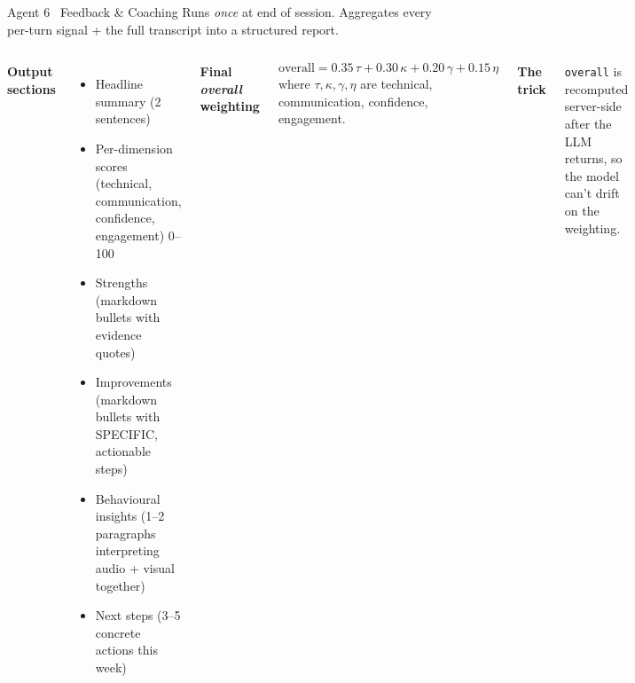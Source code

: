 \documentclass[aspectratio=169,10pt]{beamer}
\newcommand{\biglabel}[1]{\textcolor{brand}{\bfseries\large #1}}
\begin{document}
\begin{frame}{Agent 6 \textbullet\ Feedback \& Coaching}
  \vspace{0.2cm}
  \footnotesize
  Runs \emph{once} at end of session. Aggregates every per-turn signal +
  the full transcript into a structured report.

  \vspace{0.6em}
  \begin{columns}[T,onlytextwidth]
      \biglabel{Output sections}\par\smallskip
      \footnotesize
      \begin{itemize}\setlength\itemsep{1pt}
        \item Headline summary (2 sentences)
        \item Per-dimension scores (technical, communication, confidence, engagement) 0--100
        \item Strengths (markdown bullets with evidence quotes)
        \item Improvements (markdown bullets with SPECIFIC, actionable steps)
        \item Behavioural insights (1--2 paragraphs interpreting audio + visual together)
        \item Next steps (3--5 concrete actions this week)
      \end{itemize}
      \biglabel{Final \emph{overall} weighting}\par\smallskip
      \footnotesize
      \[
        \mathrm{overall} = 0.35\,\tau + 0.30\,\kappa + 0.20\,\gamma + 0.15\,\eta
      \]
      where $\tau, \kappa, \gamma, \eta$ are technical, communication,
      confidence, engagement.

      \vspace{0.6em}
      \biglabel{The trick}\par\smallskip
      \footnotesize
      \texttt{overall} is \alert{recomputed server-side} after the LLM
      returns, so the model can't drift on the weighting.
  \end{columns}
\end{frame}
\end{document}
